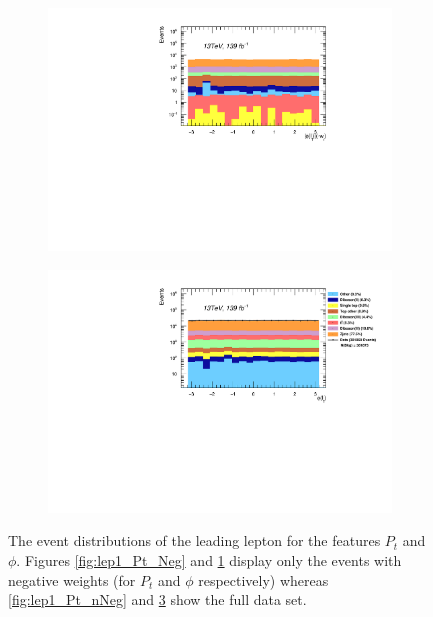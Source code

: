 \begin{figure}
{\begin{subfigure}{.6\textwidth}
        \includegraphics[width=\textwidth]{Figures/FeaturesHistograms/lep1_Phi_Neg.pdf}
        \vspace{-.75cm}
        \caption{}
        \label{fig:lep1_Phi_Neg}
    \end{subfigure}
    \begin{subfigure}{.6\textwidth}
        \includegraphics[width=\textwidth]{Figures/FeaturesHistograms/lep1_Phi_nNeg.pdf}
        \vspace{-.75cm}
        \caption{}
        \label{fig:lep1_Phi_nNeg}
    \end{subfigure}
    }
    \caption[The event distributions of the leading lepton for the features $P_t$ and $\phi$, for events with negative 
    weights and all events.]{The event distributions of the leading lepton for the features $P_t$ and $\phi$. 
    Figures \ref{fig:lep1_Pt_Neg} and \ref{fig:lep1_Phi_Neg} display only the events with 
    negative weights (for $P_t$ and $\phi$ respectively) whereas \ref{fig:lep1_Pt_nNeg} 
    and \ref{fig:lep1_Phi_nNeg} show the full data set.}
\end{figure}
